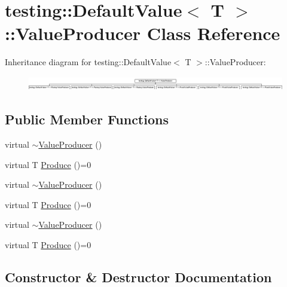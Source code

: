\hypertarget{classtesting_1_1_default_value_1_1_value_producer}{}\section{testing\+::Default\+Value$<$ T $>$\+::Value\+Producer Class Reference}
\label{classtesting_1_1_default_value_1_1_value_producer}
Inheritance diagram for testing\+::Default\+Value$<$ T $>$\+::Value\+Producer\+:\begin{figure}[H]
\begin{center}
\leavevmode
\includegraphics[height=0.618102cm]{d5/d51/classtesting_1_1_default_value_1_1_value_producer}
\end{center}
\end{figure}
\subsection*{Public Member Functions}
\begin{DoxyCompactItemize}
\item 
virtual \mbox{\hyperlink{classtesting_1_1_default_value_1_1_value_producer_aa78c53c5676f4df0efc5c319f8715963}{$\sim$\+Value\+Producer}} ()
\item 
virtual T \mbox{\hyperlink{classtesting_1_1_default_value_1_1_value_producer_adb9e38abe068ac2e792b53fd32bd7e96}{Produce}} ()=0
\item 
virtual \mbox{\hyperlink{classtesting_1_1_default_value_1_1_value_producer_aa78c53c5676f4df0efc5c319f8715963}{$\sim$\+Value\+Producer}} ()
\item 
virtual T \mbox{\hyperlink{classtesting_1_1_default_value_1_1_value_producer_adb9e38abe068ac2e792b53fd32bd7e96}{Produce}} ()=0
\item 
virtual \mbox{\hyperlink{classtesting_1_1_default_value_1_1_value_producer_aa78c53c5676f4df0efc5c319f8715963}{$\sim$\+Value\+Producer}} ()
\item 
virtual T \mbox{\hyperlink{classtesting_1_1_default_value_1_1_value_producer_adb9e38abe068ac2e792b53fd32bd7e96}{Produce}} ()=0
\end{DoxyCompactItemize}


\subsection{Constructor \& Destructor Documentation}
\mbox{\label{classtesting_1_1_default_value_1_1_value_producer_aa78c53c5676f4df0efc5c319f8715963}} 

